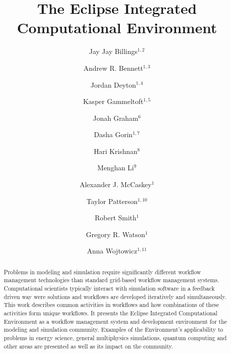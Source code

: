 \documentclass{elsart}
\begin{document}
\begin{frontmatter}

\title{The Eclipse Integrated Computational Environment}

\author{Jay Jay Billings$^{1,2}$}
\author{Andrew R. Bennett$^{1,3}$}
\author{Jordan Deyton$^{1,4}$}
\author{Kasper Gammeltoft$^{1,5}$}
\author{Jonah Graham$^{6}$}
\author{Dasha Gorin$^{1,7}$}
\author{Hari Krishnan$^{8}$}
\author{Menghan Li$^{9}$}
\author{Alexander J. McCaskey$^{1}$}
\author{Taylor Patterson$^{1,10}$}
\author{Robert Smith$^{1}$}
\author{Gregory R. Watson$^{1}$}
\author{Anna Wojtowicz$^{1,11}$}

\address{$^1$Computer Science and Mathematics Division, Oak Ridge National
Laboratory, Oak Ridge, TN 37830, USA}
\address{$^2$The Bredesen Center for Interdisciplinary Research and Graduate
Education, University of Tennessee, 444 Greve Hall, 821 Volunteer
  Blvd. Knoxville, TN 37996-3394}
\address{$^3$University of Washington, Seattle, WA 98105}
\address{$^4$General Electric Company, 3200 North Grandview Blvd Waukesha, WI
53188-1678}
\address{$^5$Georgia Institute of Technology North Avenue, Atlanta, GA 30332}
\address{$^6$Kichwa Coders Ltd. 1 Plomer Green Avenue Downley, High Wycombe
HP13 5LN United Kingdom}
\address{$^7$Northwestern University 633 Clark Street Evanston, IL 60208}
\address{$^8$Lawrence Berkeley National Laboratory, 1 Cyclotron Rd, Berkeley,
CA 94720}
\address{$^9$Department of Computer Science, and Department of Biological
Sciences, Purdue University, West Lafayette, IN 47906} 
\address{$^10$Acato Information Management, LLC 114 Union Valley Rd. Oak Ridge,
TN 37830}
\address{$^11$Colorado State University Fort Collins, CO 80523}

\begin{abstract}

Problems in modeling and simulation require significantly different
workflow management technologies than standard grid-based workflow
management systems. Computational scientists typically interact with
simulation software in a feedback driven way were solutions and
workflows are developed iteratively and simultaneously. This work
describes common activities in workflows and how combinations of these
activities form unique workflows. It presents the Eclipse Integrated
Computational Environment as a workflow management system and
development environment for the modeling and simulation community.
Examples of the Environment's applicability to problems in energy
science, general multiphysics simulations, quantum computing and other
areas are presented as well as its impact on the community.


\end{abstract}
\end{frontmatter}
\end{document}
